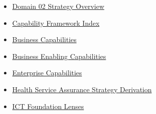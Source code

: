 \begin{itemize}

\item 
\href{https://github.com/fhirfactory/harmonia/blob/98410db60155198a75f74c79d98060070209faa1/docs/markdown/02-strategy/README.md}{Domain 02 Strategy Overview}



\item 
\href{https://github.com/fhirfactory/harmonia/blob/98410db60155198a75f74c79d98060070209faa1/docs/markdown/02-strategy/capabilities/index.md}{Capability Framework Index}



\item 
\hyperref[rad:business]{Business Capabilities}



\item 
\hyperref[rad:enabling]{Business Enabling Capabilities}



\item 
\hyperref[rad:enterprise]{Enterprise Capabilities}



\item 
\hyperref[rad:assurance-strategy]{Health Service Assurance Strategy Derivation}



\item 
\href{https://github.com/fhirfactory/harmonia/blob/98410db60155198a75f74c79d98060070209faa1/docs/markdown/02-strategy/capabilities/ict-foundation-lenses.md}{ICT Foundation Lenses}



\end{itemize}
